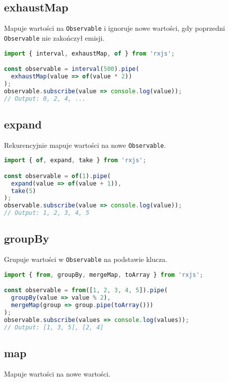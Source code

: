 \documentclass[a4paper,12pt]{article}
\begin{document}
\subsection{exhaustMap}
Mapuje wartości na \texttt{Observable} i ignoruje nowe wartości, gdy poprzedni \texttt{Observable} nie zakończył emisji.

\begin{lstlisting}[language=JavaScript, caption=Przykład użycia \texttt{exhaustMap}]
import { interval, exhaustMap, of } from 'rxjs';

const observable = interval(500).pipe(
  exhaustMap(value => of(value * 2))
);
observable.subscribe(value => console.log(value));
// Output: 0, 2, 4, ...
\end{lstlisting}

\subsection{expand}
Rekurencyjnie mapuje wartości na nowe \texttt{Observable}.

\begin{lstlisting}[language=JavaScript, caption=Przykład użycia \texttt{expand}]
import { of, expand, take } from 'rxjs';

const observable = of(1).pipe(
  expand(value => of(value + 1)),
  take(5)
);
observable.subscribe(value => console.log(value));
// Output: 1, 2, 3, 4, 5
\end{lstlisting}

\subsection{groupBy}
Grupuje wartości w \texttt{Observable} na podstawie klucza.

\begin{lstlisting}[language=JavaScript, caption=Przykład użycia \texttt{groupBy}]
import { from, groupBy, mergeMap, toArray } from 'rxjs';

const observable = from([1, 2, 3, 4, 5]).pipe(
  groupBy(value => value % 2),
  mergeMap(group => group.pipe(toArray()))
);
observable.subscribe(values => console.log(values));
// Output: [1, 3, 5], [2, 4]
\end{lstlisting}

\subsection{map}
Mapuje wartości na nowe wartości.
\end{document}
